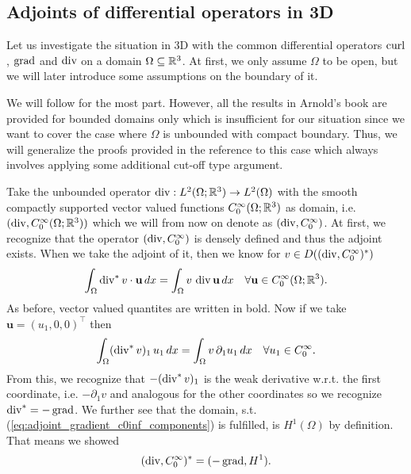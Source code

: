 \documentclass[../master_thesis.tex]{subfiles}
\begin{document}
\subsection{Adjoints of differential operators in 3D}\label{sec:adjoints_differential_operators_3d}

Let us investigate the situation in 3D with the common differential 
operators $\operatorname{curl}$, $\operatorname{grad}$ and $\operatorname{div}$ on a domain $\Omega \subseteq \mathbb{R}^3$. 
At first, we only assume  $\Omega$ to be open, but we will later 
introduce some assumptions on the boundary of it. 


We will follow \cite[Sec.\,3.4]{arnold} for the most part. However, all the results in Arnold's book 
are provided for bounded domains only which is insufficient for our situation since 
we want to cover the case where $\Omega$ is unbounded with compact boundary. Thus, 
we will generalize the proofs provided in the reference to this case which always involves 
applying some additional cut-off type argument.

Take the unbounded operator 
$\operatorname{div}: L^2(\Omega;\mathbb{R}^3) \rightarrow L^2(\Omega)$ with the smooth compactly supported 
vector valued functions
$C_0^\infty(\Omega;\mathbb{R}^3)$ as domain, i.e. $(\operatorname{div}, C_0^\infty(\Omega;\mathbb{R}^3))$ which 
we will from now on denote as $(\operatorname{div}, C_0^\infty)$. At first, we recognize that 
the operator $(\operatorname{div}, C_0^\infty)$ is densely defined and thus the adjoint exists.
When we take the adjoint of it, then we know for $v \in 
D((\operatorname{div}, C_0^\infty)^*)$
\begin{align*}
    \int_\Omega \operatorname{div} ^* v \cdot \mathbf{u} \, dx
    = \int_\Omega v \, \operatorname{div} \mathbf{u} \, dx \quad \forall 
    \mathbf{u} \in C_0^\infty(\Omega;\mathbb{R}^3).
\end{align*}
As before, vector valued quantites are written in bold.
Now if we take $\mathbf{u} = (u_1,0,0)^\top$ then 
\begin{align}
    \int_\Omega (\operatorname{div} ^* v)_1 \, u_1 \, dx
    = \int_\Omega v \, \partial_1 u_1 \, dx \quad 
        \forall u_1 \in C_0^\infty. \label{eq:adjoint_gradient_c0inf_components}
\end{align}
From this, we recognize that $-(\operatorname{div} ^* v)_1$ is the weak derivative w.r.t. the 
first coordinate, i.e. $-\partial_1 v$ and analogous for the other coordinates 
so we recognize $\operatorname{div}^* = -\operatorname{grad}$. We further see that the
domain, s.t. (\ref{eq:adjoint_gradient_c0inf_components}) is fulfilled, is $H^1(\Omega)$ 
by definition. That means we showed 
\begin{align}
    (\operatorname{div}, C_0^\infty)^* = (-\operatorname{grad}, H^1). \label{eq:adjoint_gradient_c0inf} 
\end{align}
\end{document}
